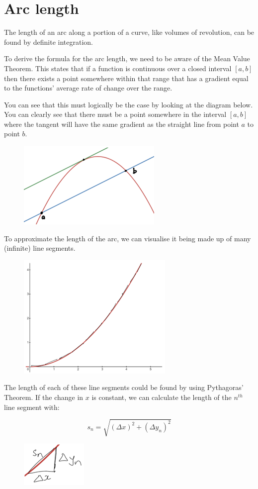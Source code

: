 \documentclass[../main.tex]{subfiles}
\begin{document}
\section{Arc length}
The length of an arc along a portion of a curve, like volumes of revolution, can be found by definite integration.

To derive the formula for the arc length, we need to be aware of the Mean Value Theorem. This states that if a function is continuous over a closed interval $[a, b]$ then there exists a point somewhere within that range that has a gradient equal to the functions' average rate of change over the range.

You can see that this must logically be the case by looking at the diagram below. You can clearly see that there must be a point somewhere in the interval $[a,b]$ where the tangent will have the same gradient as the straight line from point $a$ to point $b$.

\begin{figure}[h]
    \centering
    \includegraphics[width=0.3\linewidth]{images/arclength1.png}
\end{figure}

To approximate the length of the arc, we can visualise it being made up of many (infinite) line segments.

\begin{figure}[h]
    \centering
    \includegraphics[width=0.3\linewidth]{images/arclength2.png}
\end{figure}

The length of each of these line segments could be found by using Pythagoras' Theorem. If the change in $x$ is constant, we can calculate the length of the $n^{th}$ line segment with:

\[s_n=\sqrt{(\Delta x)^2+(\Delta y_n)^2}\]

\begin{figure}[h]
    \centering
    \includegraphics{images/arclength3.png}
\end{figure}
\end{document}
